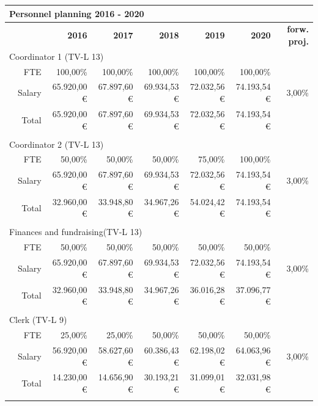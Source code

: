 \documentclass[output=guidelines,nonflat,smallfont,
draftmode
]{langsci/langscibook}
\begin{document}
{{\begin{tabular}{lrrrrrrr}
\multicolumn{5}{l}{ \textbf{{Personnel planning 2016} - 2020}}\\
\midrule
& & \textbf{2016} & \textbf{2017} & \textbf{2018} & \textbf{2019} & \textbf{2020} & \textbf{forw. proj.}\\
\midrule 
\multicolumn{5}{l}{ Coordinator 1 (TV-L 13)}\\
\midrule
&  FTE &  100,00\% &  100,00\% &  100,00\% &  100,00\% &  100,00\% & ~\\
&  Salary &  65.920,00 € &  67.897,60 € &  69.934,53 € &  72.032,56 € &  74.193,54 € &  3,00\%\\
 &  Total &  65.920,00 € &  67.897,60 € &  69.934,53 € &  72.032,56 € &  74.193,54 € & ~\\
\\
\multicolumn{5}{l}{ Coordinator 2 (TV-L 13)}\\
\midrule
&  FTE &  50,00\% &  50,00\% &  50,00\% &  75,00\% &  100,00\% & ~\\
&  Salary &  65.920,00 € &  67.897,60 € &  69.934,53 € &  72.032,56 € &  74.193,54 € &  3,00\%\\
 &  Total &  32.960,00 € &  33.948,80 € &  34.967,26 € &  54.024,42 € &  74.193,54 € & ~\\
\\
\multicolumn{5}{l}{ Finances and fundraising(TV-L 13)}\\
\midrule
&  FTE &  50,00\% &  50,00\% &  50,00\% &  50,00\% &  50,00\% & ~\\
&  Salary &  65.920,00 € &  67.897,60 € &  69.934,53 € &  72.032,56 € &  74.193,54 € &  3,00\%\\
 &  Total &  32.960,00 € &  33.948,80 € &  34.967,26 € &  36.016,28 € &  37.096,77 € & ~\\
\\
\multicolumn{5}{l}{ Clerk (TV-L 9)}\\
\midrule
&  FTE &  25,00\% &  25,00\% &  50,00\% &  50,00\% &  50,00\% & ~\\
&  Salary &  56.920,00 € &  58.627,60 € &  60.386,43 € &  62.198,02 € &  64.063,96 € &  3,00\%\\
 &  Total &  14.230,00 € &  14.656,90 € &  30.193,21 € &  31.099,01 € &  32.031,98 € & ~\\
\\
\end{tabular}
}
\noindent
{}}
\end{document}
